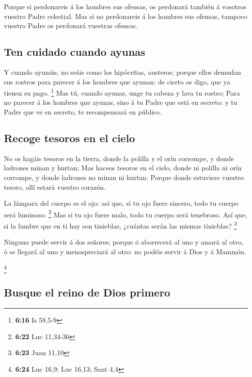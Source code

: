  Porque si perdonareis á los hombres sus ofensas, os
perdonará también á vosotros vuestro Padre celestial.  Mas
si no perdonareis á los hombres sus ofensas, tampoco vuestro Padre os
perdonará vuestras ofensas.

\hypertarget{ten-cuidado-cuando-ayunas}{%
\subsection{Ten cuidado cuando ayunas}\label{ten-cuidado-cuando-ayunas}}

 Y cuando ayunáis, no seáis como los hipócritas, austeros;
porque ellos demudan sus rostros para parecer á los hombres que ayunan:
de cierto os digo, que ya tienen su pago. \footnote{\textbf{6:16} Is
  58,5-9}  Mas tú, cuando ayunas, unge tu cabeza y lava tu
rostro;  Para no parecer á los hombres que ayunas, sino á
tu Padre que está en secreto: y tu Padre que ve en secreto, te
recompensará en público.

\hypertarget{recoge-tesoros-en-el-cielo}{%
\subsection{Recoge tesoros en el
cielo}\label{recoge-tesoros-en-el-cielo}}

 No os hagáis tesoros en la tierra, donde la polilla y el
orín corrompe, y donde ladrones minan y hurtan;  Mas haceos
tesoros en el cielo, donde ni polilla ni orín corrompe, y donde ladrones
no minan ni hurtan:  Porque donde estuviere vuestro tesoro,
allí estará vuestro corazón.

 La lámpara del cuerpo es el ojo: así que, si tu ojo fuere
sincero, todo tu cuerpo será luminoso: \footnote{\textbf{6:22} Luc
  11,34-36}  Mas si tu ojo fuere malo, todo tu cuerpo será
tenebroso. Así que, si la lumbre que en ti hay son tinieblas, ¿cuántas
serán las mismas tinieblas? \footnote{\textbf{6:23} Juan 11,10}

 Ninguno puede servir á dos señores; porque ó aborrecerá al
uno y amará al otro, ó se llegará al uno y menospreciará al otro: no
podéis servir á Dios y á Mammón.

\footnote{\textbf{6:24} Luc 16,9; Luc 16,13; Sant 4,4}

\hypertarget{busque-el-reino-de-dios-primero}{%
\subsection{Busque el reino de Dios
primero}\label{busque-el-reino-de-dios-primero}}

